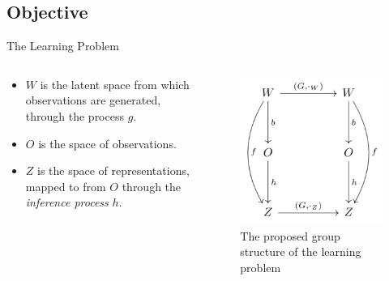 \documentclass{beamer}
\begin{document}
\subsection{Objective}
\begin{frame}{The Learning Problem}
  \begin{columns}
    \begin{column}{.5\textwidth}
        
      \begin{itemize}
        \item $W$ is the latent space from which observations are generated, through the process $g$.
        \item $O$ is the space of observations.
        \item $Z$ is the space of representations, mapped to from $O$ through the \textit{inference process} $h$.
      \end{itemize}
   \end{column} 
    \begin{column}{.5\textwidth}
   \begin{figure}
    \centering
    \includegraphics[scale=.3]{group_structure.jpeg}
    \caption{The proposed group structure of the learning problem}
   \end{figure} 
   \end{column} 
  \end{columns}
\end{frame}
\end{document}
